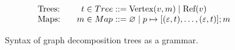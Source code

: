 






\begin{figure}
  \[
    \arraycolsep=0pt
    \begin{array}{lrlll}
      \textrm{Trees:\qquad}  & t & {}\in Tree & {}::={} & \textrm{Vertex}(v, m) \mid \textrm{Ref}(v) \\
      \textrm{Maps:}         & m & {}\in Map & {}::={} & \varnothing \mid p \mapsto [(\e, t), \ldots, (\e, t)]; m \\
    \end{array}
  \]
  \caption{Syntax of graph decomposition trees as a grammar.}
  \label{fig:Syntax of graph decomposition trees}
\end{figure}




